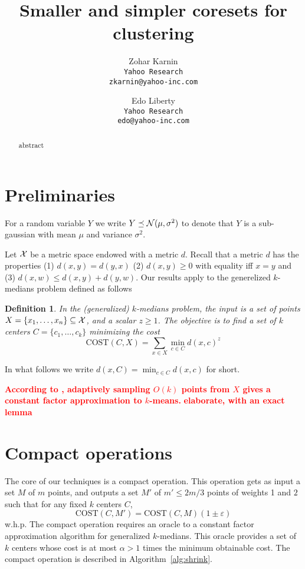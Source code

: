 \documentclass[11pt]{article}
\title{Smaller and simpler coresets for clustering}
\author{
Zohar Karnin\\ \texttt{Yahoo Research}\\ \texttt{\small zkarnin@yahoo-inc.com}
\and
Edo Liberty\\ \texttt{Yahoo Research}\\ \texttt{\small edo@yahoo-inc.com}
}
\date\nonumber
\newtheorem{definition} {Definition}
\newcommand{\eps}{\varepsilon}
\newcommand{\note}[1]{\textbf{\textcolor{red}{#1}}}
\newcommand{\cost}{\text{COST}}
\newcommand{\N}{{\cal N}}
\begin{document}
\maketitle

\begin{abstract}
abstract\end{abstract}

\section{Preliminaries}
For a random variable $Y$ we write $Y \preceq \N(\mu,\sigma^2)$ to denote that $Y$ is a sub-gaussian with mean $\mu$ and variance $\sigma^2$.

Let $\cal X$ be a metric space endowed with a metric $d$. Recall that a metric $d$ has the properties (1) $d(x,y)=d(y,x)$ (2) $d(x,y) \geq 0$ with equality iff $x=y$ and (3) $d(x,w) \leq d(x,y)+d(y,w)$. Our results apply to the generelized $k$-medians problem defined as follows
\begin{definition}
In the (generalized) $k$-medians problem, the input is a set of points $X = \{x_1,\ldots,x_n\} \subseteq {\cal X}$, and a scalar $z \geq 1$. The objective is to find a set of $k$ centers $C = \{c_1,\ldots,c_k\}$ minimizing the cost 
$$\cost(C,X) = \sum_{x \in X} \min_{c \in C} d(x,c)^z$$
\end{definition}
In what follows we write $d(x,C) = \min_{c \in C}d(x,c)$ for short.

\note{
According to \cite{AggarwalDK09}, adaptively sampling $O(k)$ points from $X$ gives a constant factor approximation to $k$-means.}
\note{elaborate, with an exact lemma}

\section{Compact operations}
The core of our techniques is a compact operation. This operation gets as input a set $M$ of $m$ points, and outputs a set $M'$ of $m' \leq 2m/3$ points of weights 1 and $2$ such that for any fixed $k$ centers $C$,
$$ \cost(C,M') = \cost(C,M) (1 \pm \eps) $$
w.h.p. The compact operation requires an oracle to a constant factor approximation algorithm for generalized $k$-medians. This oracle provides a set of $k$ centers whose cost is at most $\alpha>1$ times the minimum obtainable cost.
The compact operation is described in Algorithm~\ref{alg:shrink}.
\end{document}
